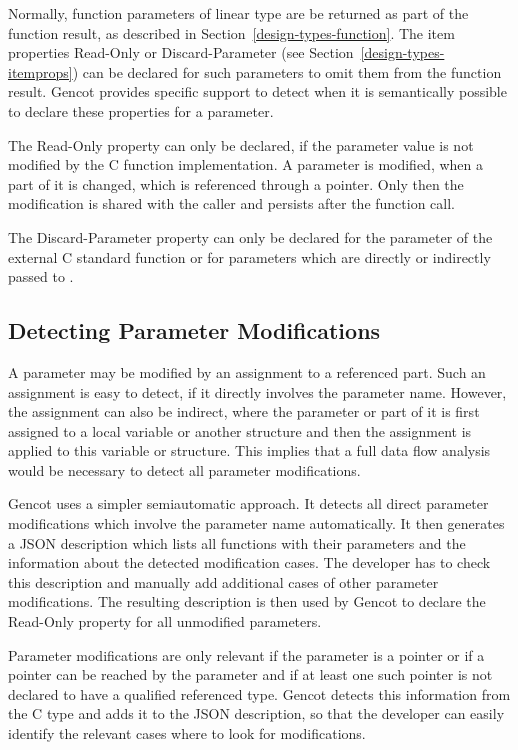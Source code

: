 Normally, function parameters of linear type are be returned as part of the function result, 
as described in Section~\ref{design-types-function}. The item properties Read-Only or Discard-Parameter
(see Section~\ref{design-types-itemprops}) can be declared for such parameters to omit them from the function 
result. Gencot provides specific support to detect when it is semantically possible to declare 
these properties for a parameter.

The Read-Only property can only be declared, if the parameter value is not modified by the C function implementation.
A parameter is modified, when a part of it is changed, which is referenced through a pointer. Only then the 
modification is shared with the caller and persists after the function call.

The Discard-Parameter property can only be declared for the parameter of the external C standard function 
or for parameters which are directly or indirectly passed to .

\subsection{Detecting Parameter Modifications}

A parameter may be modified by an assignment to a referenced part. Such an assignment
is easy to detect, if it directly involves the parameter name. However, the assignment can also be indirect, where
the parameter or part of it is first assigned to a local variable or another structure and then the assignment
is applied to this variable or structure. This implies that a full data flow analysis would be necessary
to detect all parameter modifications.

Gencot uses a simpler semiautomatic approach. It detects all direct parameter modifications which involve the 
parameter name automatically. It then generates a JSON description which lists all functions with their parameters
and the information about the detected modification cases. The developer has to check this description and
manually add additional cases of other parameter modifications. The resulting description is then used by
Gencot to declare the Read-Only property for all unmodified parameters.

Parameter modifications are only relevant if the parameter is a pointer or if a pointer can be reached by the parameter
and if at least one such pointer is not declared to have a  qualified referenced type. Gencot detects
this information from the C type and adds it to the JSON description, so that the developer can easily identify
the relevant cases where to look for modifications.

